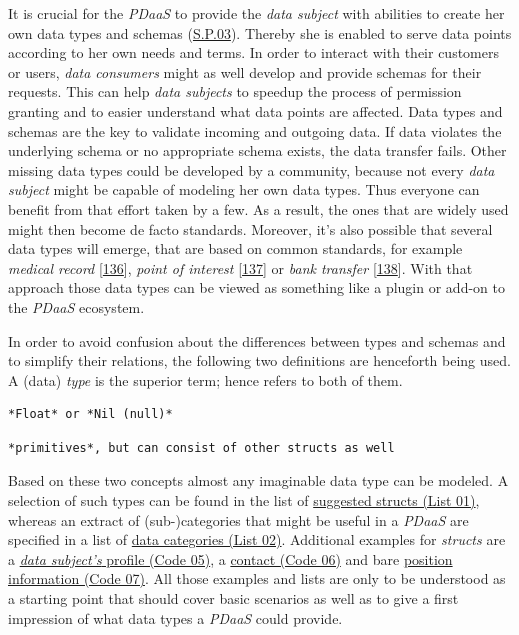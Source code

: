 \documentclass[12pt,english,a4paper,titlepage,cleardoublepage=empty,dottedtoc]{report}
\begin{document}
It is crucial for the \emph{PDaaS} to provide the \emph{data subject}
with abilities to create her own data types and schemas
(\protect\hyperlink{sp03}{S.P.03}). Thereby she is enabled to serve data
points according to her own needs and terms. In order to interact with
their customers or users, \emph{data consumers} might as well develop
and provide schemas for their requests. This can help \emph{data
subjects} to speedup the process of permission granting and to easier
understand what data points are affected. Data types and schemas are the
key to validate incoming and outgoing data. If data violates the
underlying schema or no appropriate schema exists, the data transfer
fails. Other missing data types could be developed by a community,
because not every \emph{data subject} might be capable of modeling her
own data types. Thus everyone can benefit from that effort taken by a
few. As a result, the ones that are widely used might then become de
facto standards. Moreover, it's also possible that several data types
will emerge, that are based on common standards, for example
\emph{medical record}
{[}\protect\hyperlink{ref-web_spec_data-schemas_ehr}{136}{]},
\emph{point of interest}
{[}\protect\hyperlink{ref-web_spec_data-schemas_poi}{137}{]} or
\emph{bank transfer}
{[}\protect\hyperlink{ref-web_spec_data-schemas_bank-transfer}{138}{]}.
With that approach those data types can be viewed as something like a
plugin or add-on to the \emph{PDaaS} ecosystem.

In order to avoid confusion about the differences between types and
schemas and to simplify their relations, the following two definitions
are henceforth being used. A (data) \emph{type} is the superior term;
hence refers to both of them.

\begin{verbatim}
*Float* or *Nil (null)*
\end{verbatim}

\begin{verbatim}
*primitives*, but can consist of other structs as well
\end{verbatim}

Based on these two concepts almost any imaginable data type can be
modeled. A selection of such types can be found in the list of
\protect\hyperlink{list-01_suggested-structs}{suggested structs (List
01)}, whereas an extract of (sub-)categories that might be useful in a
\emph{PDaaS} are specified in a list of
\protect\hyperlink{list-02_data-categories}{data categories (List 02)}.
Additional examples for \emph{structs} are a
\protect\hyperlink{code-05_struct_profile}{\emph{data subject's} profile
(Code 05)}, a \protect\hyperlink{code-06_struct_contact}{contact (Code
06)} and bare \protect\hyperlink{code-07_struct_position}{position
information (Code 07)}. All those examples and lists are only to be
understood as a starting point that should cover basic scenarios as well
as to give a first impression of what data types a \emph{PDaaS} could
provide.
\end{document}
